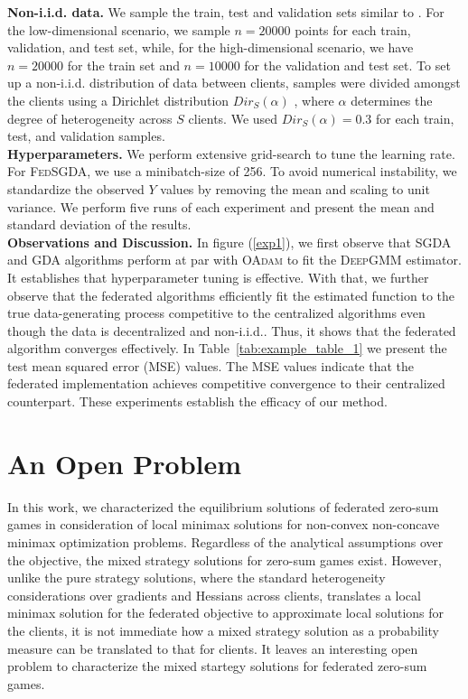 \documentclass{article}
\let\cite\relax
\newcommand*{\cite}{\citep}
\newcommand{\dgmm}{\textsc{DeepGMM}\xspace}
\newcommand{\oadam}{\textsc{OAdam}\xspace}
\newcommand{\sgda}{\textsc{SGDA}\xspace}
\newcommand{\fsgda}{\textsc{FedSGDA}\xspace}
\newcommand{\gda}{\textsc{GDA}\xspace}
\theoremstyle{definition}
\begin{document}
\textbf{Non-i.i.d. data.} We sample the train, test and validation sets similar to \cite{bennett2019deep}. For the low-dimensional scenario, we sample $n = 20000$ points for each train, validation, and test set, while, for the high-dimensional scenario, we have $n = 20000$ for the train set and $n=10000$ for the validation and test set. To set up a non-i.i.d. distribution of data between clients, samples were divided amongst the clients using a Dirichlet distribution $Dir_S(\alpha)$ \cite{wang2019federated}, where $\alpha$ determines the degree of heterogeneity across $S$ clients. We used $Dir_S(\alpha) = 0.3$ for each train, test, and validation samples.\\
\textbf{Hyperparameters.} We perform extensive grid-search to tune the learning rate. For \fsgda, we use a minibatch-size of 256. To avoid numerical instability, we standardize the observed $Y$ values by removing the mean and scaling to unit variance. We perform five runs of each experiment and present the mean and standard deviation of the results.\\
\textbf{Observations and Discussion.} In figure (\ref{exp1}), we first observe that \sgda and \gda algorithms perform at par with \oadam to fit the \dgmm estimator. It establishes that hyperparameter tuning is effective. With that, we further observe that the federated algorithms efficiently fit the estimated function to the true data-generating process competitive to the centralized algorithms even though the data is decentralized and non-i.i.d.. Thus, it shows that the federated algorithm converges effectively. In Table~\ref{tab:example_table_1} we present the test mean squared error (MSE) values. The MSE values indicate that the federated implementation achieves competitive convergence to their centralized counterpart. These experiments establish the efficacy of our method.

\section*{An Open Problem}
In this work, we characterized the equilibrium solutions of federated zero-sum games in consideration of local minimax solutions for non-convex non-concave minimax optimization problems. Regardless of the analytical assumptions over the objective, the mixed strategy solutions for zero-sum games exist. However, unlike the pure strategy solutions, where the standard heterogeneity considerations over gradients and Hessians across clients, translates a local minimax solution for the federated objective to approximate local solutions for the clients, it is not immediate how a mixed strategy solution as a probability measure can be translated to that for clients. It leaves an interesting open problem to characterize the mixed startegy solutions for federated zero-sum games.     
\printbibliography
\end{document}
